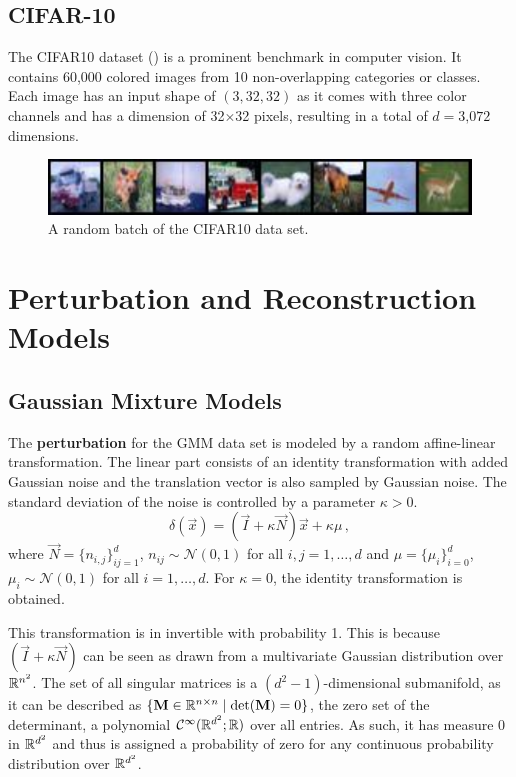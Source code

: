 \subsection{CIFAR-10}
The CIFAR10 dataset (\cite{CIFAR}) is a prominent benchmark in computer vision. 
It contains 60,000 colored images from 10 non-overlapping categories or classes.
Each image has an input shape of $(3, 32, 32)$ as it comes with three color channels 
and has a dimension of 32$\times$32 pixels, resulting in a total of $d=\text{3,072}$ dimensions.
\begin{figure}[htb]
    \centering
    \includegraphics{figures/CIFAR10_plot.pdf}
    \caption{A random batch of the CIFAR10 data set.}
    \label{fig:CIFAR10_plot}
\end{figure}





\section{Perturbation and Reconstruction Models}
\label{sec:reconstruction_models}


\subsection{Gaussian Mixture Models}

The \textbf{perturbation} for the GMM data set is modeled by
a random affine-linear transformation.
The linear part consists of an identity transformation with added Gaussian noise
and the translation vector is also sampled by Gaussian noise.
The standard deviation of the noise is controlled by a parameter $\kappa > 0$.
\[
    \delta(\vec x) = (\vec I + \kappa \vec N)\vec x + \kappa \mu \,,
\]
where $\vec N = \{n_{i, j}\}_{i j = 1}^{d}$, $n_{ij} \sim \mathcal N (0, 1)$ for all $i, j = 1 , \ldots, d$
and 
$\mu = \{\mu_i\}_{i=0}^d$, $\mu_i \sim \mathcal N(0, 1)$ for all $i=1,\ldots,d$.
For $\kappa = 0$, the identity transformation is obtained.

This transformation is in invertible with probability 1.
This is because $(\vec I + \kappa \vec N)$ can be seen as drawn 
from a multivariate Gaussian distribution over $\mathbb{R}^{n^2}$.
The set of all singular matrices is a $(d^2-1)$-dimensional submanifold,
as it can be described as $\{\mathbf M \in \mathbb{R}^{n\times n} \mid \det(\mathbf M) = 0\}$, 
the zero set of the determinant,
a polynomial $\mathcal C^{\infty}(\mathbb{R}^{d^2};\mathbb{R})$ over all entries.
As such, it has measure 0 in $\mathbb{R}^{d^2}$ and thus is assigned a probability of zero
for any continuous probability distribution over $\mathbb{R}^{d^2}$.


